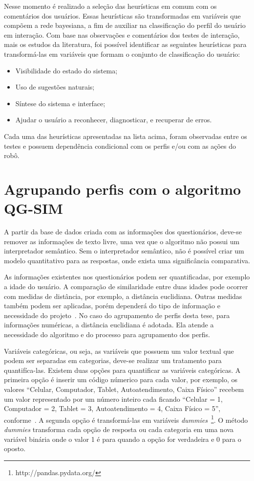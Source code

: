 Nesse momento é realizado a seleção das heurísticas em comum com os comentários dos usuários. Essas heurísticas são transformadas em variáveis que compõem a rede bayesiana, a fim de auxiliar na classificação do perfil do usuário em interação. Com base nas observações e comentários dos testes de interação, mais os estudos da literatura, foi possível identificar as seguintes heurísticas para transformá-las em variáveis que formam o conjunto de classificação do usuário:

\begin{itemize}
	\item Visibilidade do estado do sistema;
	\item Uso de sugestões naturais;
	\item Síntese do sistema e interface;
	\item Ajudar o usuário a reconhecer, diagnosticar, e recuperar de erros.
\end{itemize}

Cada uma das heurísticas apresentadas na lista acima, foram observadas entre os testes e possuem dependência condicional com os perfis e/ou com as ações do robô.

\section{Agrupando perfis com o algoritmo QG-SIM}
\label{sec:preparacao}
A partir da base de dados criada com as informações dos questionários, deve-se remover as informações de texto livre, uma vez que o algoritmo não possui um interpretador semântico. Sem o interpretador semântico, não é possível criar um modelo quantitativo para as respostas, onde exista uma significância comparativa.

As informações existentes nos questionários podem ser quantificadas, por exemplo a idade do usuário. A comparação de similaridade entre duas idades pode ocorrer com medidas de distância, por exemplo, a distância euclidiana. Outras medidas também podem ser aplicadas, porém dependerá do tipo de informação e necessidade do projeto~\cite{masiero:2013}. No caso do agrupamento de perfis desta tese, para informações numéricas, a distância euclidiana é adotada. Ela atende a necessidade do algoritmo e do processo para agrupamento dos perfis.

Variáveis categóricas, ou seja, as variáveis que possuem um valor textual que podem ser separadas em categorias, deve-se realizar um tratamento para quantifíca-las. Existem duas opções para quantificar as variáveis categóricas. A primeira opção é inserir um código númerico para cada valor, por exemplo, os valores ``Celular, Computador, Tablet, Autoatendimento, Caixa Físico'' recebem um valor representado por um número inteiro cada ficando ``Celular = 1, Computador = 2, Tablet = 3, Autoatendimento = 4, Caixa Físico = 5'', conforme~. A segunda opção é transformá-las em variáveis \emph{dummies}~\footnote{http://pandas.pydata.org/}. O método \emph{dummies} transforma cada opção de resposta ou cada categoria em uma nova variável binária onde o valor 1 é para quando a opção for verdadeira e 0 para o oposto.

